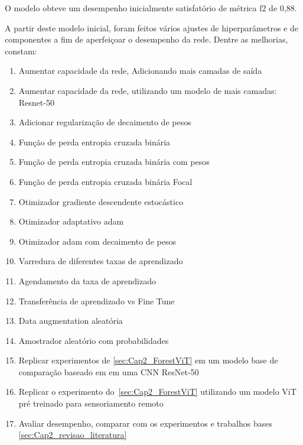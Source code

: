 O modelo obteve um desempenho inicialmente satisfatório de métrica f2 de 0,88.

A partir deste modelo inicial, foram feitos vários ajustes de hiperparâmetros e de componentes a fim de aperfeiçoar o desempenho da rede. Dentre as melhorias, constam:

\begin{enumerate}
    \item Aumentar capacidade da rede, Adicionando mais camadas de saída
    \item Aumentar capacidade da rede, utilizando um modelo de mais camadas: Resnet-50
    \item Adicionar regularização de decaimento de pesos
    \item Função de perda entropia cruzada binária
    \item Função de perda entropia cruzada binária com pesos 
    \item Função de perda entropia cruzada binária Focal
    \item Otimizador gradiente descendente estocástico
    \item Otimizador adaptativo adam 
    \item Otimizador adam com decaimento de pesos
    \item Varredura de diferentes taxas de aprendizado
    \item Agendamento da taxa de aprendizado
    \item Transferência de aprendizado vs Fine Tune
    \item Data augmentation aleatória
    \item Amostrador aleatório com probabilidades 
    \item Replicar experimentos de \ref{sec:Cap2_ForestViT} em um modelo base de comparação baseado em em uma CNN ResNet-50
    \item Replicar o experimento do~\ref{sec:Cap2_ForestViT} utilizando um modelo ViT pré treinado para sensoriamento remoto
    \item Avaliar desempenho, comparar com os experimentos e trabalhos bases \ref{sec:Cap2_revisao_literatura}
    \end{enumerate}
